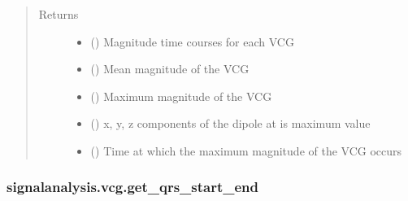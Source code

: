 \documentclass[letterpaper,10pt,english]{sphinxmanual}
\begin{document}
\begin{fulllineitems}
\begin{quote}
\begin{description}
\begin{itemize}
\end{itemize}

\item[{Returns}] \leavevmode
\sphinxAtStartPar
\begin{itemize}
\item {} 
\sphinxAtStartPar
{} () \textendash{} Magnitude time courses for each VCG

\item {} 
\sphinxAtStartPar
{} () \textendash{} Mean magnitude of the VCG

\item {} 
\sphinxAtStartPar
{} () \textendash{} Maximum magnitude of the VCG

\item {} 
\sphinxAtStartPar
{} () \textendash{} x, y, z components of the dipole at is maximum value

\item {} 
\sphinxAtStartPar
{} () \textendash{} Time at which the maximum magnitude of the VCG occurs

\end{itemize}


\end{description}\end{quote}

\end{fulllineitems}



\subsubsection{signalanalysis.vcg.get\_qrs\_start\_end}
\label{\detokenize{_autosummary/signalanalysis.vcg.get_qrs_start_end:signalanalysis-vcg-get-qrs-start-end}}\label{\detokenize{_autosummary/signalanalysis.vcg.get_qrs_start_end::doc}}
\end{document}
